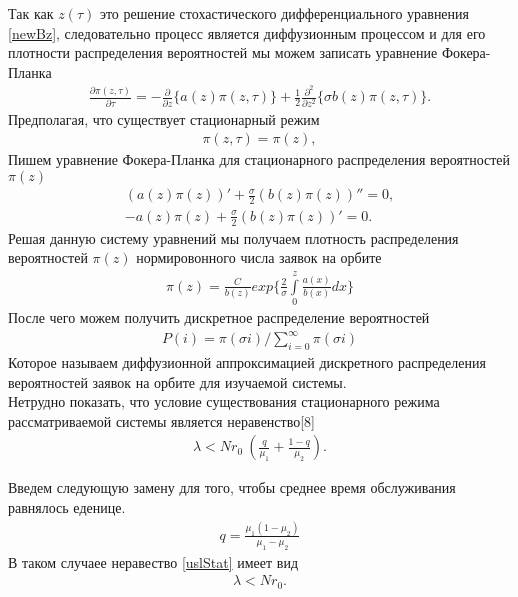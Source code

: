 Так как $z(\tau)$ это решение стохастического дифференциального уравнения \eqref{newBz}, следовательно процесс является диффузионным процессом и для его плотности распределения вероятностей мы можем записать уравнение Фокера-Планка
\begin{align}
\frac{\partial \pi (z,\tau)}{\partial \tau}=-\frac{\partial}{\partial z}\{a(z)\pi(z,\tau)\} 
+\frac{1}{2}\frac{\partial^2}{\partial z^2}\{\sigma b(z)\pi(z,\tau)\}.
\end{align}
Предполагая, что существует стационарный режим 
\begin{align}
\pi (z,\tau)=\pi(z),
\end{align}
Пишем уравнение Фокера-Планка для стационарного распределения вероятностей $\pi{(z)}$ 
\begin{align*}
(a(z)\pi(z))'+\frac{\sigma}{2}(b(z)\pi(z))''=0,\\
-a(z)\pi(z)+\frac{\sigma}{2}(b(z)\pi(z))'=0.
\end{align*}
Решая данную систему уравнений мы получаем плотность распределения вероятностей $\pi{(z)}$ нормировонного числа заявок на орбите
\begin{align}
\pi (z)= \frac{C}{b(z)}exp\{\frac{2}{\sigma} \int\limits_0^z \frac{a(x)}{b(x)}dx\}
\end{align} 
После чего можем получить дискретное распределение вероятностей
\begin{align}
P(i)=\pi(\sigma i)/\sum\limits_{i=0}^{\infty} \pi(\sigma i)
\end{align} 
Которое называем диффузионной аппроксимацией дискретного распределения вероятностей заявок на орбите для изучаемой системы.\\

Нетрудно показать, что условие существования стационарного
режима рассматриваемой системы является неравенство[8]
\begin{align}\label{uslStat}
\lambda<Nr_{0}\ (\frac{q}{\mu_{1}}+\frac{1-q}{\mu_{2}}).
\end{align}

Введем следующую замену для того, чтобы среднее время обслуживания равнялось еденице.
\begin{align*}
q=\frac{\mu_{1}(1-\mu_{2})}{\mu_{1}-\mu_{2}}
\end{align*}
В таком случаее неравество \eqref{uslStat} имеет вид
\begin{align*}
\lambda<Nr_{0}.
\end{align*}